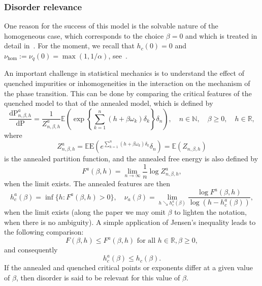\documentclass[11pt]{article}
\theoremstyle{definition}
\numberwithin{equation}{section}
\numberwithin{figure}{section}
\numberwithin{table}{section}
\newcommand{\bbE}{{\ensuremath{\mathbb E}}}
\newcommand{\bbN}{{\ensuremath{\mathbb N}}}
\newcommand{\bbR}{{\ensuremath{\mathbb R}}}
\newcommand{\ga}{\alpha}
\newcommand{\gb}{\beta}
\newcommand{\gd}{\delta}
\newcommand{\go}{\omega}
\newcommand{\dd}{\mathrm{d}}
\newcommand{\R}{\mathbb{R}}
\newcommand\bP{\ensuremath{\mathrm{P}}}
\newcommand\bE{\ensuremath{\mathrm{E}}}
\begin{document}
\subsubsection{Disorder relevance}

One reason for the success of this model is the solvable nature of the homogeneous case, which corresponds to the choice $\gb = 0$ and which is treated in detail in~\cite{Gi2007}. For the moment, we recall that $h_c(0) = 0$ and $\nu_{\hom}:= \nu_q(0) = \max(1,1/\ga)$, see~\cite[Theorem~2.1]{Gi2007}.

An important challenge in statistical mechanics is to understand the effect of quenched impurities or inhomogeneities in the interaction on the mechanism of the phase transition. This can be done by comparing the critical features of the quenched model to that of the annealed model, which is defined by
\begin{equation}\label{eq:defannmeas}
\frac{\dd \bP^a_{n,\gb,h}}{\dd \bP} = \frac{1}{Z^a_{n,\gb,h}} \bbE\left(\exp \left\{ \sum_{k=1}^n (h + \gb \go_k) \gd_k \right\} \gd_n \right), \quad n \in \bbN, \quad \gb \geq 0,\quad h \in \bbR,
\end{equation}
where
\begin{equation}\label{eq:defannpf}
Z^a_{n,\gb,h} = \bbE\bE\left(e^{\sum_{k=1}^n (h+ \gb \go_k)\gd_k} \gd_n\right) = \bbE (Z_{n, \gb, h})
\end{equation}
is the annealed partition function, and the annealed free energy is also defined by
\begin{equation}
F^a(\gb,h) = \lim_{n \to \infty} \frac{1}{n} \log Z^a_{n,\gb,h},
\end{equation}
when the limit exists. The annealed features are then
\begin{equation}
h^a_c(\gb) = \inf\{h \colon F^a(\gb,h) > 0\}, \quad \nu_a(\gb) = \lim_{h \searrow h_c^a(\gb)} \frac{\log F^a(\gb,h)}{\log (h - h_c^a(\gb))},
\end{equation}
when the limit exists (along the paper we may omit $\beta$ to lighten the notation, when there is no ambiguity). A simple application of Jensen's inequality leads to the following comparison:
\begin{equation}
F(\gb,h) \leq F^a(\gb,h) \text{ for all } h\in \R, \gb\ge0,
\end{equation}
and consequently
\begin{equation}
h_c^a(\gb) \leq h_c(\gb).
\end{equation}
If the annealed and quenched critical points or exponents differ at a given value of $\gb$, then disorder is said to be relevant for this value of $\beta$.
\end{document}
